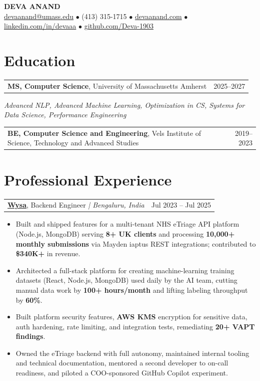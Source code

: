 \documentclass[letterpaper,11pt]{article}
\makeatletter
\newcommand{\eduItem}[3]{%
  \begin{tabular*}{\textwidth}{@{}l@{\extracolsep{\fill}}r@{}}
    \textbf{#1}, #2 & #3 \\
  \end{tabular*}\par
}
\newcommand{\expItem}[4]{%
  \vspace{3pt}
  \begin{tabular*}{\textwidth}{@{}l@{\extracolsep{\fill}}r@{}}
    \textbf{#1}, #2 \textit{| #3} & #4 \\
  \end{tabular*}\par\vspace{-2pt}
}
\makeatother
\begin{document}
\begin{center}
    {\fontsize{18}{20}\selectfont\bfseries DEVA ANAND}\\ \vspace{3pt}
    {\small
    \href{mailto:devaanand@umass.edu}{devaanand@umass.edu}
    \enspace$\bullet$\enspace
    (413) 315-1715
    \enspace$\bullet$\enspace
    \href{https://devaanand.com}{devaanand.com}
    \enspace$\bullet$\enspace
    \href{https://linkedin.com/in/devaaa/}{linkedin.com/in/devaaa}
    \enspace$\bullet$\enspace
    \href{https://github.com/Deva-1903}{github.com/Deva-1903}}
\end{center}
\vspace{-6pt}

\section{Education}
\eduItem{MS, Computer Science}{University of Massachusetts Amherst}{2025--2027}
{\small\textit{Advanced NLP, Advanced Machine Learning, Optimization in CS, Systems for Data Science, Performance Engineering}}\par
\vspace{3pt}
\eduItem{BE, Computer Science and Engineering}{Vels Institute of Science, Technology and Advanced Studies}{2019--2023}

\section{Professional Experience}

\expItem{\href{https://www.wysa.io}{Wysa}}{Backend Engineer}{Bengaluru, India}{Jul 2023 -- Jul 2025}
\begin{itemize}
  \item Built and shipped features for a multi-tenant NHS eTriage API platform (Node.js, MongoDB) serving \textbf{8+ UK clients} and processing \textbf{10{,}000+ monthly submissions} via Mayden iaptus REST integrations; contributed to \textbf{\$340K+} in revenue.
  \item Architected a full-stack platform for creating machine-learning training datasets (React, Node.js, MongoDB) used daily by the AI team, cutting manual data work by \textbf{100+ hours/month} and lifting labeling throughput by \textbf{60\%}.
  \item Built platform security features, \textbf{AWS KMS} encryption for sensitive data, auth hardening, rate limiting, and integration tests, remediating \textbf{20+ VAPT findings}.
  \item Owned the eTriage backend with full autonomy, maintained internal tooling and technical documentation, mentored a second developer to on-call readiness, and piloted a COO-sponsored GitHub Copilot experiment.
\end{itemize}
\end{document}
